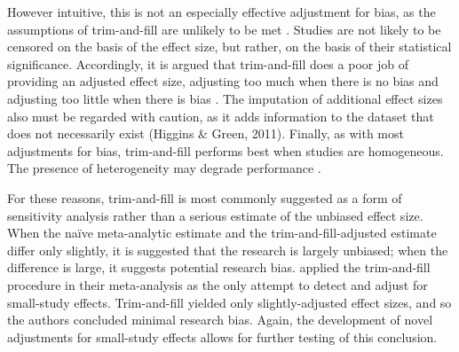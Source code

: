 \documentclass[man, mask]{apa6}
\begin{document}
However intuitive, this is not an especially effective adjustment for bias, as the assumptions of trim-and-fill are unlikely to be met \citep{Simonsohn:etal:2014b}. Studies are not likely to be censored on the basis of the effect size, but rather, on the basis of their statistical significance. Accordingly, it is argued that trim-and-fill does a poor job of providing an adjusted effect size, adjusting too much when there is no bias and adjusting too little when there is bias \citep{Simonsohn:etal:2014b}. %
The imputation of additional effect sizes also must be regarded with caution, as it adds information to the dataset that does not necessarily exist (Higgins \& Green, 2011). Finally, as with most adjustments for bias, trim-and-fill performs best when studies are homogeneous. The presence of heterogeneity may degrade performance \citep{Terrin:etal:2003}. %
\nocite{Higgins:Green:2011}

For these reasons, trim-and-fill is most commonly suggested as a form of sensitivity analysis rather than a serious estimate of the unbiased effect size. When the na{\"i}ve meta-analytic estimate and the trim-and-fill-adjusted estimate differ only slightly, it is suggested that the research is largely unbiased; when the difference is large, it suggests potential research bias.
\citet{Anderson:etal:2010} applied the trim-and-fill procedure in their meta-analysis as the only attempt to detect and adjust for small-study effects. Trim-and-fill yielded only slightly-adjusted effect sizes, and so the authors concluded minimal research bias.
Again, the development of novel adjustments for small-study effects allows for further testing of this conclusion.
\end{document}
